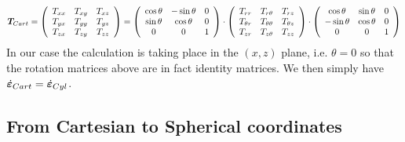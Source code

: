 \[
{\bm T}_{\tiny Cart}=
\left(
\begin{array}{ccc}
T_{xx} & T_{xy} & T_{xz} \\
T_{yx} & T_{yy} & T_{yz} \\
T_{zx} & T_{zy} & T_{zz} 
\end{array}
\right)
=
\left(
\begin{array}{ccc}
 \cos \theta&-\sin \theta&0 \\
\sin \theta&\cos \theta&0 \\
0 & 0 & 1 
\end{array}
\right)
\cdot
\left(
\begin{array}{ccc}
T_{rr}       & T_{r\theta}      & T_{rz} \\
T_{\theta r} & T_{\theta\theta} & T_{\theta z} \\
T_{z r}      & T_{z \theta}     & T_{zz}
\end{array}
\right)
\cdot
\left(
\begin{array}{ccc}
\cos \theta & \sin \theta&0 \\
-\sin \theta &  \cos \theta&0 \\
0 & 0 & 1 
\end{array}
\right)
\]
In our case the calculation is taking place in the $(x,z)$
plane, i.e. $\theta=0$ so that the rotation matrices above 
are in fact identity matrices. 
We then simply have 
$\dot{\bm \varepsilon}_{\tiny Cart}=
\dot{\bm \varepsilon}_{\tiny Cyl}$.


\subsection*{From Cartesian to Spherical coordinates}

